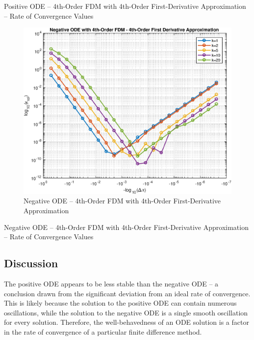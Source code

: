 \documentclass[10pt, reqno]{article}		%
\numberwithin{equation}{section}
\begin{document}
\vfill

\begin{table}[H]
	
	\caption{Positive ODE -- 4th-Order FDM with 4th-Order First-Derivative Approximation -- Rate of Convergence Values}	
\end{table}

\begin{figure}[H]
	\begin{center}
		\includegraphics[width = 0.76\linewidth]{negative_ode_order_4_fd_order_4}
		\caption{Negative ODE -- 4th-Order FDM with 4th-Order First-Derivative Approximation}	
	\end{center}
\end{figure}

\vfill

\begin{table}[H]
		
		\caption{Negative ODE -- 4th-Order FDM with 4th-Order First-Derivative Approximation -- Rate of Convergence Values}	
\end{table}

\newpage

\subsection{Discussion}

The positive ODE appears to be less stable than the negative ODE -- a conclusion drawn from the significant deviation from an ideal rate of convergence. This is likely because the solution to the positive ODE can contain numerous oscillations, while the solution to the negative ODE is a single smooth oscillation for every solution. Therefore, the well-behavedness of an ODE solution is a factor in the rate of convergence of a particular finite difference method.
\end{document}

